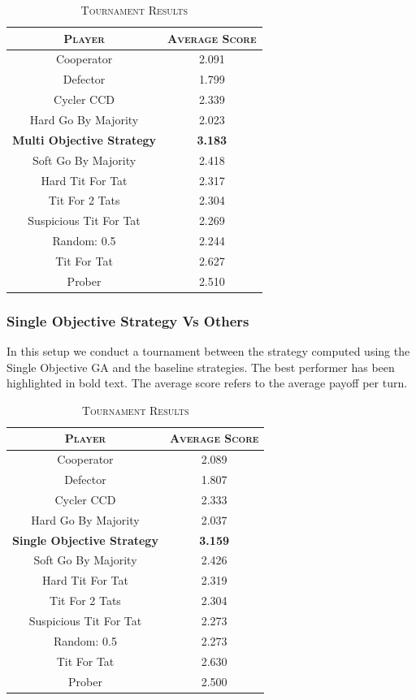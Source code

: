 \documentclass[a4paper]{article}
\begin{document}
	\begin{table}[H]
	  \begin{center}
	    \begin{tabular}{c|c}
	      \toprule
	      \textsc{Player} & \textsc{Average Score}\\
	      \midrule
			Cooperator & 2.091\\
			Defector & 1.799\\
			Cycler CCD & 2.339\\
			Hard Go By Majority & 2.023\\
			\textbf{Multi Objective Strategy} & \textbf{3.183}\\
			Soft Go By Majority & 2.418\\
			Hard Tit For Tat & 2.317\\
			Tit For 2 Tats & 2.304\\
			Suspicious Tit For Tat & 2.269\\
			Random: 0.5 & 2.244\\
			Tit For Tat & 2.627\\
			Prober & 2.510\\
		  \bottomrule
	    \end{tabular}
	    \caption{\textsc{Tournament Results}}
	  \end{center}
	\end{table}  

	\subsubsection{Single Objective Strategy Vs Others}

In this setup we conduct a tournament between the strategy computed using the Single Objective GA and the baseline strategies. The best performer has been highlighted in bold text. The average score refers to the average payoff per turn.
	
	\begin{table}[H]
	  \begin{center}
	    \begin{tabular}{c|c}
	      \toprule
	      \textsc{Player} & \textsc{Average Score}\\
	      \midrule
			Cooperator & 2.089\\
			Defector & 1.807\\
			Cycler CCD & 2.333\\
			Hard Go By Majority & 2.037\\
			\textbf{Single Objective Strategy} & \textbf{3.159}\\
			Soft Go By Majority & 2.426\\
			Hard Tit For Tat & 2.319\\
			Tit For 2 Tats & 2.304\\
			Suspicious Tit For Tat & 2.273\\
			Random: 0.5 & 2.273\\
			Tit For Tat & 2.630\\
			Prober & 2.500\\
		  \bottomrule
	    \end{tabular}
	    \caption{\textsc{Tournament Results}}
	  \end{center}
	\end{table}  
\end{document}
